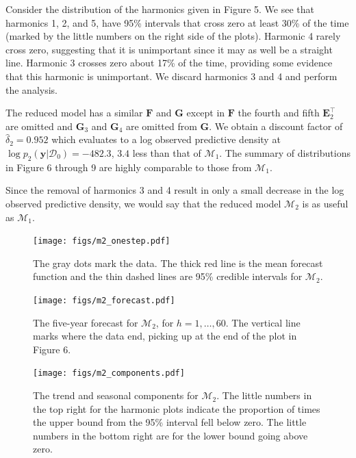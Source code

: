 \documentclass[12pt]{article}
\newcommand{\m}[1]{\mathbf{\bm{#1}}}
\begin{document}
\noindent Consider the distribution of the harmonics given in Figure 5. We see that harmonics 1, 2, and 5, have 95\% intervals that cross zero at least 30\% of the time (marked by the little numbers on the right side of the plots). Harmonic 4 rarely cross zero, suggesting that it is unimportant since it may as well be a straight line. Harmonic 3 crosses zero about 17\% of the time, providing some evidence that this harmonic is unimportant. We discard harmonics 3 and 4 and perform the analysis.
\bigskip

\noindent The reduced model has a similar $\m{F}$ and $\m{G}$ except in $\m{F}$ the fourth and fifth $\m{E}_2^\top$ are omitted and $\m{G}_3$ and $\m{G}_4$ are omitted from $\m{G}$. We obtain a discount factor of $\hat{\delta}_2=0.952$ which evaluates to a log observed predictive density at $\log p_2(\m{y}|\mathcal{D}_0)=-482.3$, $3.4$ less than that of $\mathcal{M}_1$. The summary of distributions in Figure 6 through 9 are highly comparable to those from $\mathcal{M}_1$.
\bigskip

\noindent Since the removal of harmonics 3 and 4 result in only a small decrease in the log observed predictive density, we would say that the reduced model $\mathcal{M}_2$ is as useful as $\mathcal{M}_1$.

\newpage
\begin{figure}[H]
\begin{center}
\texttt{[image: figs/m2\_onestep.pdf]}
\end{center}
\caption{The gray dots mark the data. The thick red line is the mean forecast function and the thin dashed lines are 95\% credible intervals for $\mathcal{M}_2$.}
\end{figure}

\begin{figure}[H]
\begin{center}
\texttt{[image: figs/m2\_forecast.pdf]}
\end{center}
\caption{The five-year forecast for $\mathcal{M}_2$, for $h=1,\ldots,60$. The vertical line marks where the data end, picking up at the end of the plot in Figure 6.}
\end{figure}

\begin{figure}[H]
\begin{center}
\texttt{[image: figs/m2\_components.pdf]}
\end{center}
\caption{The trend and seasonal components for $\mathcal{M}_2$. The little numbers in the top right for the harmonic plots indicate the proportion of times the upper bound from the 95\% interval fell below zero. The little numbers in the bottom right are for the lower bound going above zero.}
\end{figure}
\end{document}
